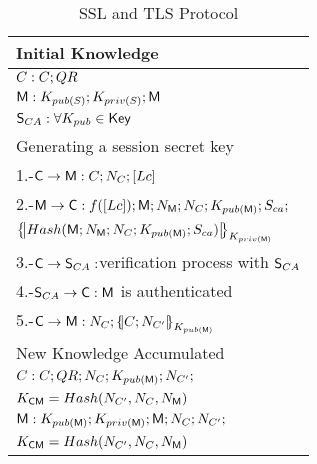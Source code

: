 \begin{table}[htb]
\footnotesize
\begin{center}
\caption{SSL and TLS Protocol}
\label{table:sslAndtlsProtocol}
\begin{tabular}{|l|}
\hline
  Initial Knowledge                                                                     \\\hline
            $C:C; QR$                                                                  \\ 
            $\textsf{M}: K_{pub(S)}; K_{priv(S)} ; \textsf{M}$                 \\ 
            $\textsf{S}_{CA}: \forall K_{pub}\in \textsf{Key}\;$                                   \\ \hline 
  Generating a session secret key                                                          \\
            1.-$\textsf{C}\rightarrow \textsf{M}:C; N_{C}; [Lc]$                         \\ 
            2.-$\textsf{M}\rightarrow \textsf{C}: f([Lc]); \textsf{M} ; N_{\textsf{M}}; N_{C}; 
                 K_{pub(\textsf{M})}; S_{ca}; $                                            \\ 
            \hspace{3mm} $\fat{Hash(\Server\lnk N_{\Server}\lnk N_{C}\lnk K_{pub(\Server)}\lnk 
                        S_{ca})}_{K_{priv(\Server)}}$                                          \\ 
            3.-$\textsf{C}\rightarrow \textsf{S}_{CA}:$verification process with $\textsf{S}_{CA}$             \\ 
            4.-$\textsf{S}_{CA} \rightarrow \textsf{C}: \textsf{M}$ is authenticated                     \\ 
            5.-$\Client\rightarrow \Server: N_{C}\lnk\fat{C\lnk N_{C'}}_{K_{pub(\Server)}}$      \\ \hline
  New Knowledge Accumulated                                                               \\
            $C:C; QR ; N_{C}; K_{pub(\textsf{M})}; N_{C'} ; $                                    \\
            \hspace{5mm} $K_{\textsf{C}\textsf{M}}=Hash(N_{C'},N_{C},N_{\textsf{M}})$                              \\ 
            $\textsf{M}: K_{pub(\textsf{M})}; K_{priv(\textsf{M})}; \textsf{M}; N_{C}; N_{C'};$    \\
            \hspace{5mm} $K_{\textsf{C}\textsf{M}}=Hash(N_{C'},N_{C},N_{\textsf{M}})$                               \\ \hline \hline 
\end{tabular}
\end{center}
\end{table}
\normalsize
